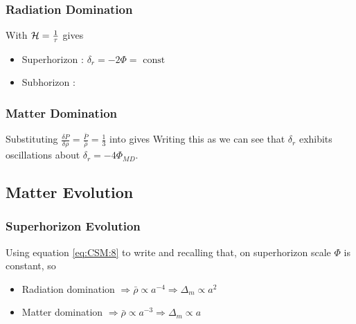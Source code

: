 \documentclass{article}
\begin{document}
\subsubsection*{Radiation Domination}
With $\mathcal{H} = \frac{1}{\tau}$ gives 
\begin{itemize}
    \item Superhorizon : $\delta_r = -2\Phi = \text{ const}$ 
    \item Subhorizon : 
\end{itemize}

\subsubsection*{Matter Domination}

Substituting $\frac{\delta P}{\delta \rho} = \frac{\bar{P}}{\bar{\rho}} = \frac{1}{3} $ into 
gives 
Writing this as 
we can see that $\delta_r$ exhibits oscillations about $\delta_r = -4\Phi_{MD}$. 

\subsection{Matter Evolution}

\subsubsection*{Superhorizon Evolution} 
Using equation \ref{eq:CSM:8} to write 
and recalling that, on superhorizon scale $\Phi$ is constant, so 
\begin{itemize}
    \item Radiation domination $\Rightarrow \bar{\rho} \propto a^{-4} \Rightarrow \Delta_m \propto a^2$
    \item Matter domination $\Rightarrow \bar{\rho} \propto a^{-3} \Rightarrow \Delta_m \propto a$
\end{itemize}
\end{document}

